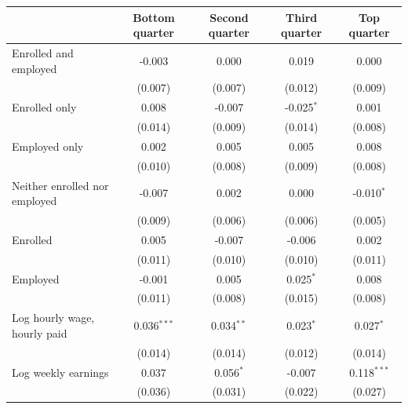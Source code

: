 \begin{tabular}{lcccc}
\toprule
 & Bottom quarter & Second quarter & Third quarter & Top quarter \\
\midrule
Enrolled and employed & -0.003 & 0.000 & 0.019 & 0.000 \\
 & (0.007) & (0.007) & (0.012) & (0.009) \\
Enrolled only & 0.008 & -0.007 & -0.025$^{*}$ & 0.001 \\
 & (0.014) & (0.009) & (0.014) & (0.008) \\
Employed only & 0.002 & 0.005 & 0.005 & 0.008 \\
 & (0.010) & (0.008) & (0.009) & (0.008) \\
Neither enrolled nor employed & -0.007 & 0.002 & 0.000 & -0.010$^{*}$ \\
 & (0.009) & (0.006) & (0.006) & (0.005) \\
Enrolled & 0.005 & -0.007 & -0.006 & 0.002 \\
 & (0.011) & (0.010) & (0.010) & (0.011) \\
Employed & -0.001 & 0.005 & 0.025$^{*}$ & 0.008 \\
 & (0.011) & (0.008) & (0.015) & (0.008) \\
Log hourly wage, hourly paid & 0.036$^{***}$ & 0.034$^{**}$ & 0.023$^{*}$ & 0.027$^{*}$ \\
 & (0.014) & (0.014) & (0.012) & (0.014) \\
Log weekly earnings & 0.037 & 0.056$^{*}$ & -0.007 & 0.118$^{***}$ \\
 & (0.036) & (0.031) & (0.022) & (0.027) \\
\bottomrule
\end{tabular}
